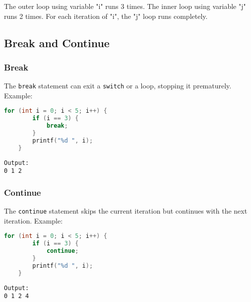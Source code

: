 The outer loop using variable "i" runs 3 times.  
The inner loop using variable "j" runs 2 times.  
For each iteration of "i", the "j" loop runs completely.  

\subsection{Break and Continue}

\subsubsection{Break}

The \verb|break| statement can exit a \verb|switch| or a loop, stopping it prematurely.
Example:
\begin{lstlisting}[language=c]
	for (int i = 0; i < 5; i++) {
		if (i == 3) {
			break;  
		}
		printf("%d ", i);
	}
\end{lstlisting}
\begin{verbatim}
Output:
0 1 2
\end{verbatim}

\subsubsection{Continue}

The \verb|continue| statement skips the current iteration but continues with the next iteration.
Example:
\begin{lstlisting}[language=c]
	for (int i = 0; i < 5; i++) {
		if (i == 3) {
			continue;
		}
		printf("%d ", i);
	}
\end{lstlisting}
\begin{verbatim}
Output:
0 1 2 4
\end{verbatim}

